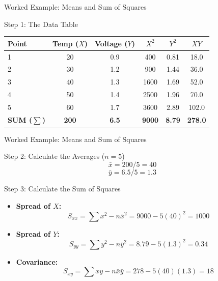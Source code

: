 \begin{frame}{Worked Example: Means and Sum of Squares}
    \begin{solution}{Step 1: The Data Table}
        \centering
        \begin{tabular}{l c c c c c}
            \hline
            \textbf{Point} & \textbf{Temp ($X$)} & \textbf{Voltage ($Y$)} & \textbf{$X^2$} & \textbf{$Y^2$} & \textbf{$XY$} \\
            \hline
            1 & 20 & 0.9 & 400 & 0.81 & 18.0 \\
            2 & 30 & 1.2 & 900 & 1.44 & 36.0 \\
            3 & 40 & 1.3 & 1600 & 1.69 & 52.0 \\
            4 & 50 & 1.4 & 2500 & 1.96 & 70.0 \\
            5 & 60 & 1.7 & 3600 & 2.89 & 102.0 \\
            \hline
            \textbf{SUM ($\sum$)} & \textbf{200} & \textbf{6.5} & \textbf{9000} & \textbf{8.79} & \textbf{278.0} \\
            \hline
        \end{tabular}
    \end{solution}
\end{frame}

\begin{frame}{Worked Example: Means and Sum of Squares}
    \begin{solutioncont}{Step 2: Calculate the Averages ($n=5$)}
        $$\bar{x} = 200 / 5 = 40$$
        $$\bar{y} = 6.5 / 5 = 1.3$$
    \end{solutioncont}
\end{frame}
\begin{frame}
    \begin{solutioncont}{Step 3: Calculate the Sum of Squares}
        \begin{itemize}
            \item \textbf{Spread of $X$:} 
            $$S_{xx} = \sum x^2 - n\bar{x}^2 = 9000 - 5(40)^2 = 1000$$
            
            \item \textbf{Spread of $Y$:} 
            $$S_{yy} = \sum y^2 - n\bar{y}^2 = 8.79 - 5(1.3)^2 = 0.34$$
            
            \item \textbf{Covariance:} 
            $$S_{xy} = \sum xy - n\bar{x}\bar{y} = 278 - 5(40)(1.3) = 18$$
        \end{itemize}
    \end{solutioncont}
\end{frame}

